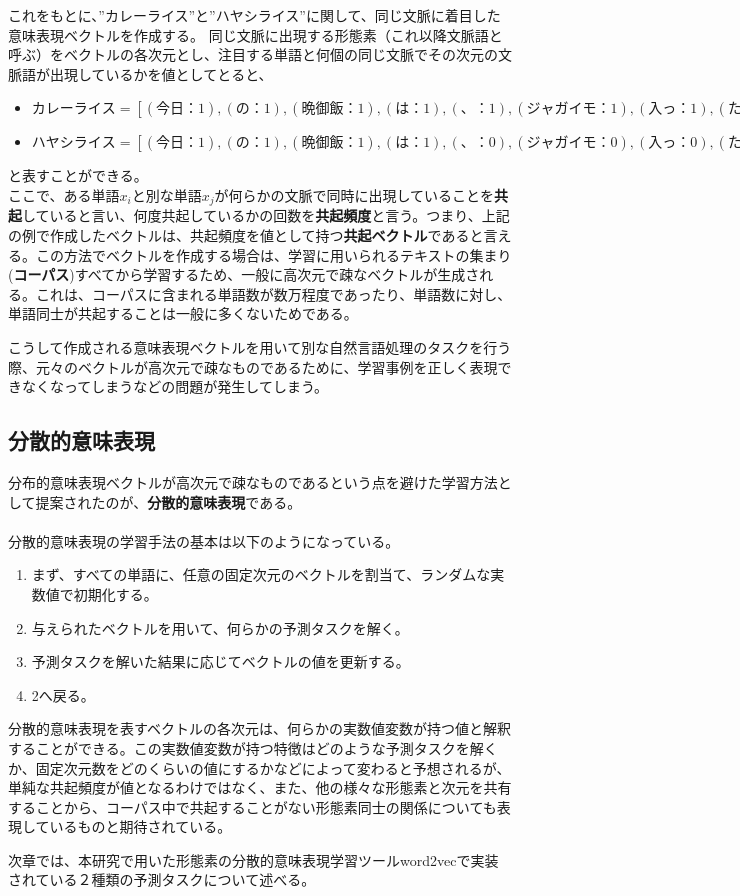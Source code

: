 これをもとに、”カレーライス”と”ハヤシライス”に関して、同じ文脈に着目した意味表現ベクトルを作成する。
同じ文脈に出現する形態素（これ以降文脈語と呼ぶ）をベクトルの各次元とし、注目する単語と何個の同じ文脈でその次元の文脈語が出現しているかを値としてとると、
\begin{itemize}
  \label{weight_equation}
  \item $カレーライス = [(今日：1),(の：1),(晩御飯：1),(は：1),(、：1),(ジャガイモ：1),(入っ：1),(た：1),(だ：1),(。：1)]$
  \item $ハヤシライス = [(今日：1),(の：1),(晩御飯：1),(は：1),(、：0),(ジャガイモ：0),(入っ：0),(た：0),(だ：1),(。：1)]$
\end{itemize}
と表すことができる。\\

ここで、ある単語$x_i$と別な単語$x_j$が何らかの文脈で同時に出現していることを\textbf{共起}していると言い、何度共起しているかの回数を\textbf{共起頻度}と言う。つまり、上記の例で作成したベクトルは、共起頻度を値として持つ\textbf{共起ベクトル}であると言える。\cite{book_wm}この方法でベクトルを作成する場合は、学習に用いられるテキストの集まり(\textbf{コーパス})すべてから学習するため、一般に高次元で疎なベクトルが生成される。これは、コーパスに含まれる単語数が数万程度であったり、単語数に対し、単語同士が共起することは一般に多くないためである。

こうして作成される意味表現ベクトルを用いて別な自然言語処理のタスクを行う際、元々のベクトルが高次元で疎なものであるために、学習事例を正しく表現できなくなってしまうなどの問題が発生してしまう。

\subsection{分散的意味表現}
分布的意味表現ベクトルが高次元で疎なものであるという点を避けた学習方法として提案されたのが、\textbf{分散的意味表現}である。\\
\\
分散的意味表現の学習手法の基本は以下のようになっている。\\
\begin{enumerate}
  \item まず、すべての単語に、任意の固定次元のベクトルを割当て、ランダムな実数値で初期化する。
  \item 与えられたベクトルを用いて、何らかの予測タスクを解く。
  \item 予測タスクを解いた結果に応じてベクトルの値を更新する。
  \item 2へ戻る。
\end{enumerate}

分散的意味表現を表すベクトルの各次元は、何らかの実数値変数が持つ値と解釈することができる。この実数値変数が持つ特徴はどのような予測タスクを解くか、固定次元数をどのくらいの値にするかなどによって変わると予想されるが、単純な共起頻度が値となるわけではなく、また、他の様々な形態素と次元を共有することから、コーパス中で共起することがない形態素同士の関係についても表現しているものと期待されている。

次章では、本研究で用いた形態素の分散的意味表現学習ツールword2vecで実装されている２種類の予測タスクについて述べる。

